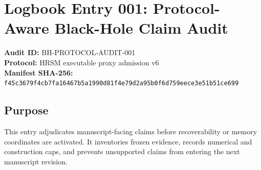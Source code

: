 \documentclass[11pt]{article}
\begin{document}
\section*{Logbook Entry 001: Protocol-Aware Black-Hole Claim Audit}
\textbf{Audit ID:} BH-PROTOCOL-AUDIT-001\\
\textbf{Protocol:} HRSM executable proxy admission v6\\
\textbf{Manifest SHA-256:} \texttt{f45c3679f4cb7fa16467b5a1990d81f4e79d2a95b0f6d759eece3e51b51ce699}
\subsection*{Purpose}
This entry adjudicates manuscript-facing claims before recoverability or memory coordinates are activated. It inventories frozen evidence, records numerical and construction caps, and prevents unsupported claims from entering the next manuscript revision.
\end{document}

